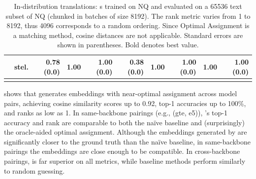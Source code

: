 \begin{table}[!b]
\begin{tabular}{llrrrrrrrr}
         & stel. & \textbf{0.78 {\tiny (0.0)}} & \textbf{1.00} & \textbf{1.00 {\tiny (0.0)}} & 0.38 {\tiny (0.0)} & \textbf{1.00} & \textbf{1.00 {\tiny (0.0)}} & \textbf{1.00} & \textbf{1.00 {\tiny (0.0)}} \\
        \bottomrule\\[-1.6ex]
    \end{tabular}
    \caption{In-distribution translations: \atk{}s trained on NQ and evaluated on a 65536 text subset of NQ (chunked in batches of size 8192). The rank metric varies from 1 to 8192, thus 4096 corresponds to a random ordering. Since Optimal Assignment is a matching method, cosine distances are not applicable.  Standard errors are shown in parentheses. Bold denotes best value.}
    \label{tab:embedding_comparison}
\end{table}

 shows that \atk{} generates embeddings with near-optimal assignment across model pairs, achieving cosine similarity scores up to 0.92, top-1 accuracies up to 100\%, and ranks as low as 1. In same-backbone pairings (e.g., (gte, e5)), \atk{}'s top-1 accuracy and rank are comparable to both the naïve baseline and (surprisingly) the oracle-aided optimal assignment. Although the embeddings generated by \atk{} are significantly closer to the ground truth than the naïve baseline, in same-backbone pairings the embeddings are close enough to be compatible.  In cross-backbone pairings, \atk{} is far superior on all metrics, while baseline methods perform similarly to random guessing.




